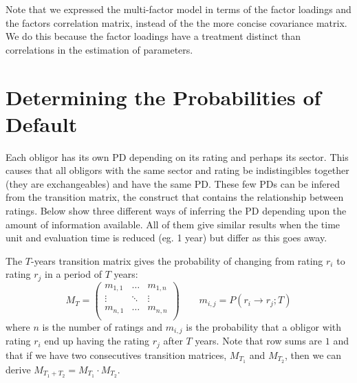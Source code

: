\documentclass[11pt,fleqn]{book} %
\begin{document}
Note that we expressed the multi-factor model in terms of the factor 
loadings and the factors correlation matrix, instead of the the more concise 
covariance matrix. We do this because the factor loadings have a treatment 
distinct than correlations in the estimation of parameters.


\section{Determining the Probabilities of Default}

Each obligor has its own PD depending on its rating and perhaps its
sector. This causes that all obligors with the same sector and rating be
indistingibles together (they are exchangeables) and have the 
same PD. These few PDs can be infered from the transition matrix, 
the construct that contains the relationship between ratings.
Below show three different ways of inferring the PD depending 
upon the amount of information available. All of them give similar 
results when the time unit and evaluation time is reduced (eg. 1 year) 
but differ as this goes away.

\begin{definition}
	\label{def:tm}
	The $T$-years transition matrix gives the probability of changing 
	from rating $r_i$ to rating $r_j$ in a period of $T$ years:
	\begin{displaymath}
		M_T = \left(
		\begin{array}{ccc}
			m_{1,1} & \dots  & m_{1,n} \\
			\vdots  & \ddots & \vdots  \\
			m_{n,1} & \dots  & m_{n,n} \\
		\end{array}
		\right)
		\qquad
		m_{i,j} = P(r_i \to r_j;T)
	\end{displaymath}
	where $n$ is the number of ratings and $m_{i,j}$ is the probability that a
	obligor with rating $r_i$ end up having the rating $r_j$ after $T$ years.
	Note that row sums are $1$ and that if we have two consecutives transition 
	matrices, $M_{T_1}$ and $M_{T_2}$, then we can derive 
	$M_{T_1+T_2} = M_{T_1} \cdot M_{T_2}$.
\end{definition}
\end{document}
